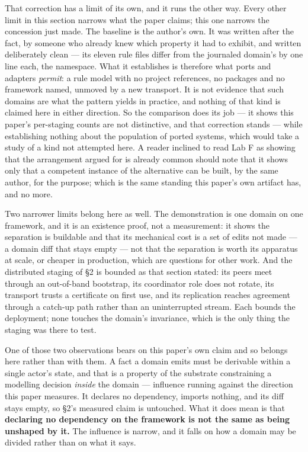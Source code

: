 \documentclass[
]{article}
\newcounter{none} %
\begin{document}
That correction has a limit of its own, and it runs the other way. Every
other limit in this section narrows what the paper claims; this one
narrows the concession just made. The baseline is the author's own. It
was written after the fact, by someone who already knew which property
it had to exhibit, and written deliberately clean --- its eleven rule
files differ from the journaled domain's by one line each, the
namespace. What it establishes is therefore what ports and adapters
\emph{permit}: a rule model with no project references, no packages and
no framework named, unmoved by a new transport. It is not evidence that
such domains are what the pattern yields in practice, and nothing of
that kind is claimed here in either direction. So the comparison does
its job --- it shows this paper's per-staging counts are not
distinctive, and that correction stands --- while establishing nothing
about the population of ported systems, which would take a study of a
kind not attempted here. A reader inclined to read Lab F as showing that
the arrangement argued for is already common should note that it shows
only that a competent instance of the alternative can be built, by the
same author, for the purpose; which is the same standing this paper's
own artifact has, and no more.

Two narrower limits belong here as well. The demonstration is one domain
on one framework, and it is an existence proof, not a measurement: it
shows the separation is buildable and that its mechanical cost is a set
of edits not made --- a domain diff that stays empty --- not that the
separation is worth its apparatus at scale, or cheaper in production,
which are questions for other work. And the distributed staging of §2 is
bounded as that section stated: its peers meet through an out-of-band
bootstrap, its coordinator role does not rotate, its transport trusts a
certificate on first use, and its replication reaches agreement through
a catch-up path rather than an uninterrupted stream. Each bounds the
deployment; none touches the domain's invariance, which is the only
thing the staging was there to test.

One of those two observations bears on this paper's own claim and so
belongs here rather than with them. A fact a domain emits must be
derivable within a single actor's state, and that is a property of the
substrate constraining a modelling decision \emph{inside} the domain ---
influence running against the direction this paper measures. It declares
no dependency, imports nothing, and its diff stays empty, so §2's
measured claim is untouched. What it does mean is that \textbf{declaring
no dependency on the framework is not the same as being unshaped by it.}
The influence is narrow, and it falls on how a domain may be divided
rather than on what it says.
\end{document}
